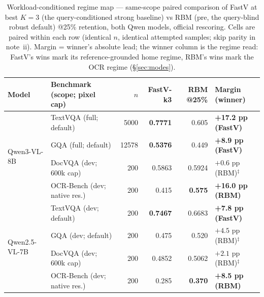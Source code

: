 \documentclass[sigconf,review,anonymous]{acmart}
\begin{document}
\begin{table}[t]
  \centering
  \small
  \caption{Workload-conditioned regime map --- same-scope paired comparison of
    FastV at best $K = 3$ (the query-conditioned strong baseline) vs RBM (pre,
    the query-blind robust default) @25\% retention, both Qwen models, official
    rescoring. Cells are paired within each row (identical $n$, identical
    attempted samples; skip parity in note~ii). Margin = winner's absolute
    lead; the winner column is the regime read: FastV's wins mark its
    reference-grounded home regime, RBM's wins mark the OCR regime
    (\S\ref{sec:modes}).}
  \label{tab:tab3}
  \begin{tabular}{@{}ll r r r l@{}}
    \toprule
    Model & Benchmark (scope; pixel cap) & $n$ & FastV-k3 & RBM @25\% & Margin (winner) \\
    \midrule
    \multirow{4}{*}{Qwen3-VL-8B}
      & TextVQA (full; default)      & 5000  & \textbf{0.7771} & 0.605  & \textbf{+17.2 pp (FastV)} \\
      & GQA (full; default)          & 12578 & \textbf{0.5376} & 0.449  & \textbf{+8.9 pp (FastV)} \\
      & DocVQA (dev; 600k cap)       & 200   & 0.5863          & 0.5924 & $+0.6$ pp (RBM)$^{\ddagger}$ \\
      & OCR-Bench (dev; native res.) & 200   & 0.415           & \textbf{0.575} & \textbf{+16.0 pp (RBM)} \\
    \midrule
    \multirow{4}{*}{Qwen2.5-VL-7B}
      & TextVQA (dev; default)       & 200   & \textbf{0.7467} & 0.6683 & \textbf{+7.8 pp (FastV)} \\
      & GQA (dev; default)           & 200   & 0.475           & 0.520 & $+4.5$ pp (RBM)$^{\ddagger}$ \\
      & DocVQA (dev; 600k cap)       & 200   & 0.4852          & 0.5062 & $+2.1$ pp (RBM)$^{\ddagger}$ \\
      & OCR-Bench (dev; native res.) & 200   & 0.285           & \textbf{0.370} & \textbf{+8.5 pp (RBM)} \\
    \bottomrule
  \end{tabular}


\end{table}
\end{document}
